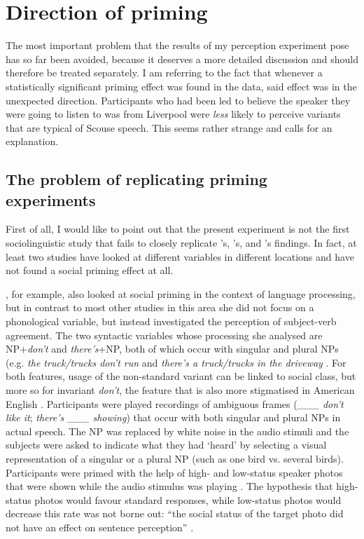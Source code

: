 	\section{Direction of priming}
		\label{sec.perc_res.disc.direction}

The most important problem that the results of my perception experiment pose has so far been avoided, because it deserves a more detailed discussion and should therefore be treated separately.
I am referring to the fact that whenever a statistically significant priming effect was found in the data, said effect was in the unexpected direction.
Participants who had been led to believe the speaker they were going to listen to was from Liverpool were \emph{less} likely to perceive variants that are typical of Scouse speech.
This seems rather strange and calls for an explanation.

		\subsection{The problem of replicating priming experiments}

First of all, I would like to point out that the present experiment is not the first sociolinguistic study that fails to closely replicate \citeauthor{niedzielski1999}'s, \citeauthor{hayetal2006a}'s, and \citeauthor{haydrager2010}'s findings.
In fact, at least two studies have looked at different variables in different locations and have not found a social priming effect at all.

\citeauthor{squires2013}, for example, also looked at social priming in the context of language processing, but in contrast to most other studies in this area she did not focus on a phonological variable, but instead investigated the perception of subject-verb agreement.
The two syntactic variables whose processing she analysed are NP+\emph{don't} and \emph{there's}+NP, both of which occur with singular and plural NPs (e.g. \emph{the truck/trucks don't run} and \emph{there's a truck/trucks in the driveway} \parencite[cf.][206]{squires2013}.
For both features, usage of the non-standard variant can be linked to social class, but more so for invariant \emph{don't}, the feature that is also more stigmatised in American English \parencite[cf.][207--208]{squires2013}.
Participants were played recordings of ambiguous frames (\emph{\_\_\_ don't like it}; \emph{there's \_\_\_ showing}) that occur with both singular and plural NPs in actual speech.
The NP was replaced by white noise in the audio stimuli and the subjects were asked to indicate what they had `heard' by selecting a visual representation of a singular or a plural NP (such as one bird vs. several birds).
Participants were primed with the help of high- and low-status speaker photos that were shown while the audio stimulus was playing \parencite[cf.][210--211]{squires2013}.
The hypothesis that high-status photos would favour standard responses, while low-status photos would decrease this rate was not borne out: ``the social status of the target photo did not have an effect on sentence perception'' \parencite[216]{squires2013}.

